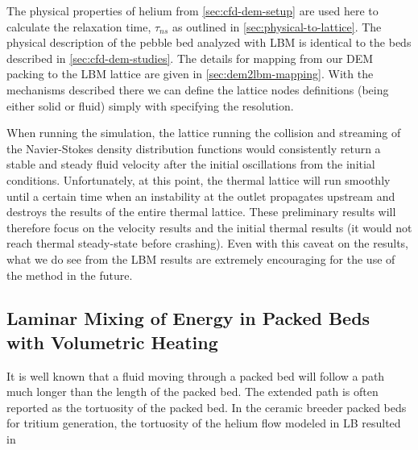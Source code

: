 The physical properties of helium from \cref{sec:cfd-dem-setup} are used here to calculate the relaxation time, $\tau_{ns}$ as outlined in \cref{sec:physical-to-lattice}. The physical description of the pebble bed analyzed with LBM is identical to the beds described in \cref{sec:cfd-dem-studies}. The details for mapping from our DEM packing to the LBM lattice are given in \cref{sec:dem2lbm-mapping}. With the mechanisms described there we can define the lattice nodes definitions (being either solid or fluid) simply with specifying the resolution.

When running the simulation, the lattice running the collision and streaming of the Navier-Stokes density distribution functions would consistently return a stable and steady fluid velocity after the initial oscillations from the initial conditions. Unfortunately, at this point, the thermal lattice will run smoothly until a certain time when an instability at the outlet propagates upstream and destroys the results of the entire thermal lattice. These preliminary results will therefore focus on the velocity results and the initial thermal results (it would not reach thermal steady-state before crashing). Even with this caveat on the results, what we do see from the LBM results are extremely encouraging for the use of the method in the future.






\subsection{Laminar Mixing of Energy in Packed Beds with Volumetric Heating}

It is well known that a fluid moving through a packed bed will follow a path much longer than the length of the packed bed. The extended path is often reported as the tortuosity of the packed bed. In the ceramic breeder packed beds for tritium generation, the tortuosity of the helium flow modeled in LB resulted in 


